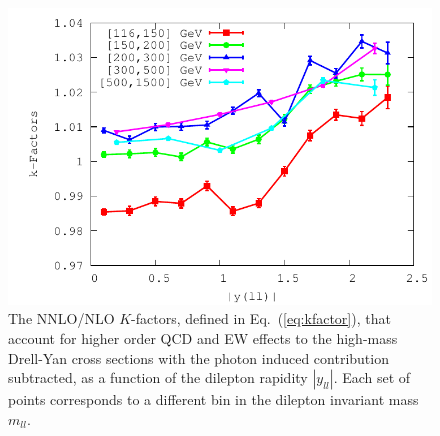 \begin{figure}[t]
\centering
\includegraphics[width=0.95\columnwidth]{figs/kF_2D.pdf}
\caption{The NNLO/NLO $K$-factors, defined in Eq.~(\ref{eq:kfactor}),
  that account for higher order QCD and EW effects to the high-mass
  Drell-Yan cross sections with the photon induced contribution subtracted,
  as a function of the dilepton rapidity $|y_{ll}|$.
  Each set of points corresponds to a different bin in the dilepton
  invariant mass $m_{ll}$.
}
\label{fig:kf}
\end{figure}





